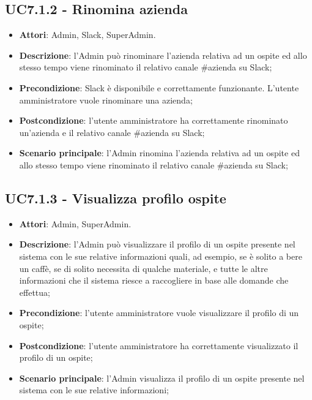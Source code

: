 \documentclass[../AnalisiDeiRequisiti_v4.0.0.tex]{subfiles}
\begin{document}
\subsection{UC7.1.2 - Rinomina azienda} 
\label{sssec:UC7.1.2} 
\begin{itemize} 
\item \textbf{Attori}: Admin, Slack, SuperAdmin.
\item \textbf{Descrizione}: l'Admin può rinominare l'azienda relativa ad un ospite ed allo stesso tempo viene rinominato il relativo canale \#azienda su Slack;
\item \textbf{Precondizione}: Slack è disponibile e correttamente funzionante. L'utente amministratore vuole rinominare una azienda;
\item \textbf{Postcondizione}: l'utente amministratore ha correttamente rinominato un'azienda e il relativo canale \#azienda su Slack;
\item \textbf{Scenario principale}: l'Admin rinomina l'azienda relativa ad un ospite ed allo stesso tempo viene rinominato il relativo canale \#azienda su Slack;
\end{itemize} 
\subsection{UC7.1.3 - Visualizza profilo ospite} 
\label{sssec:UC7.1.3} 
\begin{itemize} 
\item \textbf{Attori}: Admin, SuperAdmin.
\item \textbf{Descrizione}: l'Admin può visualizzare il profilo di un ospite presente nel sistema con le sue relative informazioni quali, ad esempio, se è solito a bere un caffè, se di solito necessita di qualche materiale, e tutte le altre informazioni che il sistema riesce a raccogliere in base alle domande che effettua;
\item \textbf{Precondizione}: l'utente amministratore vuole visualizzare il profilo di un ospite;
\item \textbf{Postcondizione}: l'utente amministratore ha correttamente visualizzato il profilo di un ospite;
\item \textbf{Scenario principale}: l'Admin visualizza il profilo di un ospite presente nel sistema con le sue relative informazioni;
\end{itemize}

\newpage
\end{document}
